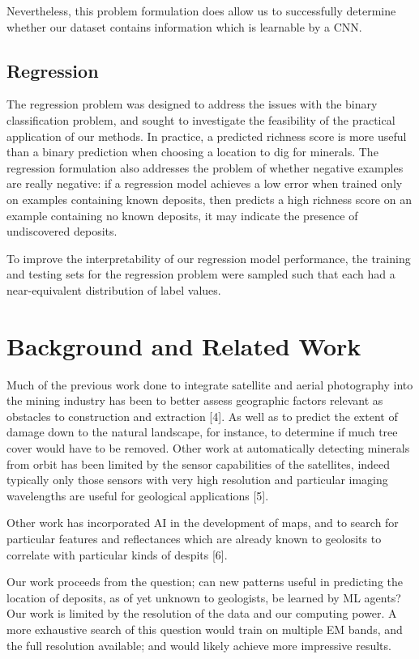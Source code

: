 \documentclass[10pt]{article}
\begin{document}
Nevertheless, this problem formulation does allow us to successfully determine
whether our dataset contains information which is learnable by a CNN. 

\subsection{Regression}\label{sec:reg}

The regression problem was designed to address the issues with the
binary classification problem, and sought to investigate the feasibility of
the practical application of our methods. In practice, a predicted richness
score is more useful than a binary prediction when choosing a location to dig
for minerals. The regression formulation also addresses the problem of
whether negative examples are really negative: if a regression model
achieves a low error when trained only on examples containing known deposits,
then predicts a high richness score on an example containing no known deposits,
it may indicate the presence of undiscovered deposits.

To improve the interpretability of our regression model performance,
the training and testing sets for the regression problem were sampled
such that each had a near-equivalent distribution of label values.

\section{Background and Related Work}

Much of the previous work done to integrate satellite and aerial photography into
the mining industry has been to better assess geographic factors relevant as
obstacles to construction and extraction [4]. As well as to predict the extent of
damage down to the natural landscape, for instance, to determine if much tree
cover would have to be removed. Other work at automatically detecting minerals
from orbit has been limited by the sensor capabilities of the satellites, indeed
typically only those sensors with very high resolution and particular imaging
wavelengths are useful for geological applications [5]. 

Other work has incorporated AI in the development of maps, and to search for
particular features and reflectances which are already known to geolosits to
correlate with  particular kinds of despits [6]. 

Our work proceeds from the question; can new patterns useful in predicting the
location of deposits, as of yet unknown to geologists, be learned by ML agents?
Our work is limited by the resolution of the data and our computing power. A more
exhaustive search of this question would train on multiple EM bands, and the full
resolution available; and would likely achieve more impressive results.
\end{document}
